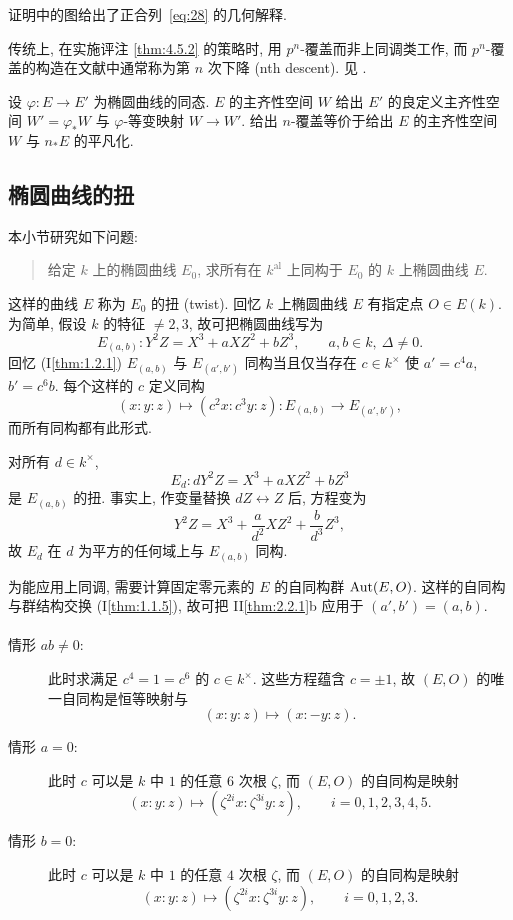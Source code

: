 证明中的图给出了正合列~\eqref{eq:28} 的几何解释.

传统上, 在实施评注 \ref{thm:4.5.2} 的策略时, 用 $p^n$-覆盖而非上同调类工作, 而 $p^n$-覆盖的构造在文献中通常称为第 $n$ 次下降 (nth descent). 见 \cite[\S 26]{cassels1966}.

\begin{aside} \label{thm:4.7.11} 
设 $\varphi\colon E\to E'$ 为椭圆曲线的同态. $E$ 的主齐性空间 $W$ 给出 $E'$ 的良定义主齐性空间 $W' = \varphi_*W$ 与 $\varphi$-等变映射 $W\to W'$. 给出 $n$-覆盖等价于给出 $E$ 的主齐性空间 $W$ 与 $n_*E$ 的平凡化.
\end{aside}

\subsection*{椭圆曲线的扭}

本小节研究如下问题:
\begin{quote}
给定 $k$ 上的椭圆曲线 $E_0$, 求所有在 $k^{\mathrm{al}}$ 上同构于 $E_0$ 的 $k$ 上椭圆曲线 $E$.
\end{quote}
这样的曲线 $E$ 称为 $E_0$ 的扭 (twist). 回忆 $k$ 上椭圆曲线 $E$ 有指定点 $O\in E(k)$. 为简单, 假设 $k$ 的特征 $\neq 2, 3$, 故可把椭圆曲线写为
\[
E_{(a,b)}\colon Y^2Z = X^3 + aXZ^2 + bZ^3, \qquad a, b\in k, \ \Delta\neq 0.
\]
回忆 (I\ref{thm:1.2.1}) $E_{(a,b)}$ 与 $E_{(a',b')}$ 同构当且仅当存在 $c\in k^{\times}$ 使 $a' = c^4a$, $b' = c^6b$. 每个这样的 $c$ 定义同构
\[
(x:y:z)\mapsto(c^2x:c^3y:z)\colon E_{(a,b)}\to E_{(a',b')},
\]
而所有同构都有此形式.

\begin{example} \label{thm:4.7.12} 
对所有 $d\in k^{\times}$,
\[
E_d\colon dY^2Z = X^3 + aXZ^2 + bZ^3
\]
是 $E_{(a,b)}$ 的扭. 事实上, 作变量替换 $dZ\leftrightarrow Z$ 后, 方程变为
\[
Y^2Z = X^3 + \frac{a}{d^2}XZ^2 + \frac{b}{d^3}Z^3,
\]
故 $E_d$ 在 $d$ 为平方的任何域上与 $E_{(a,b)}$ 同构.
\end{example}

为能应用上同调, 需要计算固定零元素的 $E$ 的自同构群 $\operatorname{Aut}(E, O)$. 这样的自同构与群结构交换 (I\ref{thm:1.1.5}), 故可把 II\ref{thm:2.2.1}b 应用于 $(a', b') = (a, b)$.

\paragraph{} 
\begin{description}
    \item[情形 $ab\neq 0$:] 此时求满足 $c^4 = 1 = c^6$ 的 $c\in k^{\times}$. 这些方程蕴含 $c = \pm 1$, 故 $(E, O)$ 的唯一自同构是恒等映射与
    \[
    (x:y:z)\mapsto(x:-y:z).
    \]
    \item[情形 $a = 0$:] 此时 $c$ 可以是 $k$ 中 $1$ 的任意 $6$ 次根 $\zeta$, 而 $(E, O)$ 的自同构是映射\[
    (x:y:z)\mapsto(\zeta^{2i}x:\zeta^{3i}y:z), \qquad i = 0, 1, 2, 3, 4, 5.
    \]
    \item[情形 $b = 0$:] 此时 $c$ 可以是 $k$ 中 $1$ 的任意 $4$ 次根 $\zeta$, 而 $(E, O)$ 的自同构是映射
    \[
    (x:y:z)\mapsto(\zeta^{2i}x:\zeta^{3i}y:z), \qquad i = 0, 1, 2, 3.
    \]
\end{description}

